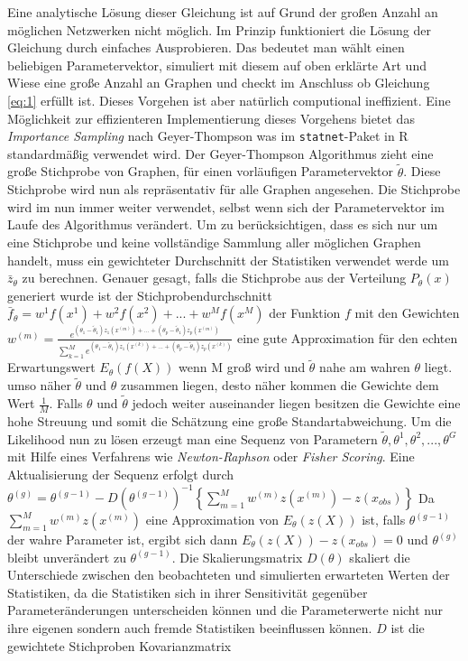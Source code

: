 \documentclass[a4paper,ngerman,oneside,titlepage,bibliography=totoc,11pt]{scrreprt}
\begin{document}
Eine analytische Lösung dieser Gleichung ist auf Grund der großen Anzahl an möglichen Netzwerken nicht möglich. Im Prinzip funktioniert die Lösung der Gleichung durch einfaches Ausprobieren. Das bedeutet man wählt einen beliebigen Parametervektor, simuliert mit diesem auf oben erklärte Art und Wiese eine große Anzahl an Graphen und checkt im Anschluss ob Gleichung \ref{eq:1} erfüllt ist. Dieses Vorgehen ist aber natürlich computional ineffizient. Eine Möglichkeit zur effizienteren Implementierung dieses Vorgehens bietet das \emph{Importance Sampling} nach Geyer-Thompson was im \texttt{statnet}-Paket \citep{pack:statnet} in R  \citep{R} standardmäßig verwendet wird. Der Geyer-Thompson Algorithmus zieht eine große Stichprobe von Graphen, für einen vorläufigen Parametervektor $\widetilde{\theta}$. Diese Stichprobe wird nun als repräsentativ für alle Graphen angesehen. Die Stichprobe wird im nun immer weiter verwendet, selbst wenn sich der Parametervektor im Laufe des Algorithmus verändert. Um zu berücksichtigen, dass es sich nur um eine Stichprobe und keine vollständige Sammlung aller möglichen Graphen handelt, muss ein gewichteter Durchschnitt der Statistiken verwendet werde um $\bar{z}_\theta$ zu berechnen. Genauer gesagt, falls die Stichprobe aus der Verteilung $P_\theta(x)$ generiert wurde ist der Stichprobendurchschnitt $\bar{f}_\theta = w^1 f(x^1) + w^2 f(x^2) + ... + w^M f(x^M)$ der Funktion $f$ mit den Gewichten $w^{(m)} = \frac{e^{(\theta_1-\widetilde{\theta}_1)z_1(x^{(m)})+...+(\theta_p-\widetilde{\theta}_1)z_p(x^{(m)})}}{\sum_{k=1}^{M}{e^{(\theta_1-\widetilde{\theta}_1)z_1(x^{(k)})+...+(\theta_p-\widetilde{\theta}_1)z_p(x^{(k)})}}}$ 
eine gute Approximation für den echten Erwartungswert $E_\theta(f(X))$ wenn M groß wird und $\widetilde{\theta}$ nahe am wahren $\theta$ liegt. umso näher $\widetilde{\theta}$ und $\theta$ zusammen liegen, desto näher kommen die Gewichte dem Wert $\frac{1}{M}$. Falls $\theta$ und $\widetilde{\theta}$ jedoch weiter auseinander liegen besitzen die Gewichte eine hohe Streuung und somit die Schätzung eine große Standartabweichung.
Um die Likelihood nun zu lösen erzeugt man eine Sequenz von Parametern $\widetilde{\theta},\theta^{1}, \theta^{2},...,\theta^{G}$mit Hilfe eines Verfahrens wie \emph{Newton-Raphson} oder \emph{Fisher Scoring}. Eine Aktualisierung der Sequenz erfolgt durch $\theta^{(g)} = \theta^{(g-1)} - {D(\theta^{(g-1)})}^{-1}\left\{\sum^{M}_{m = 1}{w^{(m)}z(x^{(m)})} - z(x_{obs})\right\}$ Da $\sum^{M}_{m = 1}{w^{(m)}z(x^{(m)})}$ eine Approximation von $E_\theta(z(X))$ ist, falls $\theta^{(g-1)}$ der wahre Parameter ist, ergibt sich dann $E_\theta(z(X)) - z(x_{obs}) = 0$ und $\theta^{(g)}$ bleibt unverändert zu $\theta^{(g-1)}$. Die Skalierungsmatrix $D(\theta)$ skaliert die Unterschiede zwischen den beobachteten und simulierten erwarteten Werten der Statistiken, da die Statistiken sich in ihrer Sensitivität gegenüber Parameteränderungen unterscheiden können und die Parameterwerte nicht nur ihre eigenen sondern auch fremde Statistiken beeinflussen können. $D$ ist die gewichtete Stichproben Kovarianzmatrix 
\end{document}
